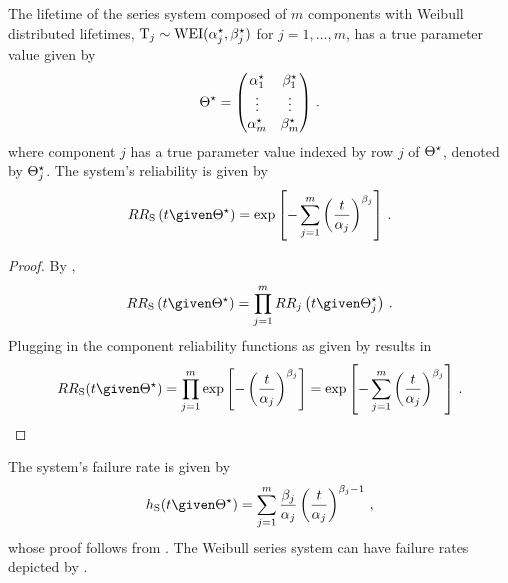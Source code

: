 \documentclass[../main.tex]{subfiles}
\begin{document}
The lifetime of the series system composed of $m$ components with Weibull distributed lifetimes, $\mathrm{T}_j \sim \text{WEI}({\alpha}^{\star}_j, {\beta}^{\star}_j)$ for $j=1,\ldots,m$, has a true parameter value given by
\begin{equation}
    {\Theta}^{\star} =
    \left(
    \begin{matrix}
        {\alpha}^{\star}_1 & {\beta}^{\star}_1\\
        \vdots & \vdots\\
        {\alpha}^{\star}_m & {\beta}^{\star}_m
    \end{matrix}
    \right)\,.
\end{equation}
where component $j$ has a true parameter value indexed by row $j$ of ${\Theta}^{\star}$, denoted by ${\Theta}^{\star}_j$. The system's reliability is given by
\begin{equation}
\label{eq:sys_weibull_reliability_function}
    \srv{R_{\sv}} \left(t \given \tparam\sysparam \right)
    = \exp \left[-\sum_{j=1}^{m} \left( \frac{t}{\alpha_j}\right)^{\beta_j} \right]\,.
\end{equation}
\begin{proof}
By ,
\begin{equation}
    \srv{R_{\sv}} \left(t \given \tparam\sysparam\right) = \prod_{j=1}^{m} \srv{R_j} \left(t \given \tparam{\sysparam}_j \right)\,.
\end{equation}
Plugging in the component reliability functions as given by  results in
\begin{equation}
    \srv{R}_{\sv}(t \given \tparam\sysparam) = \prod_{j=1}^{m} \exp \left [-\left(\frac{t}{\alpha_j}\right)^{\beta_j} \right ] = \exp \left[-\sum_{j=1}^{m} \left( \frac{t}{\alpha_j}\right)^{\beta_j} \right]\,.
\end{equation}
\end{proof}
The system's failure rate is given by
\begin{equation}
\label{eq:sys_weibull_failure_rate_function}
    \haz_{\sv}(t \given \tparam\sysparam) =
        \sum_{j=1}^{m} \frac{\beta_j}{\alpha_j}\left(\frac{t}{\alpha_j}\right)^{\beta_j-1}\,,
\end{equation}
whose proof follows from . The Weibull series system can have failure rates depicted by .
\end{document}
